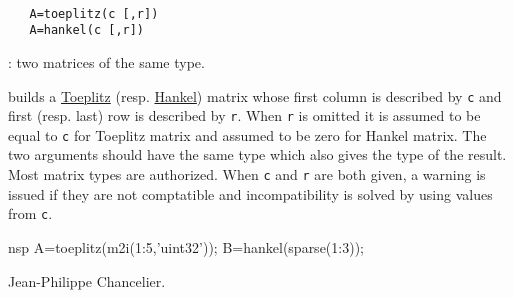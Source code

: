 
\begin{mandesc}
  \\ %
\end{mandesc}
\begin{calling_sequence}
\begin{verbatim}
   A=toeplitz(c [,r])   
   A=hankel(c [,r])   
\end{verbatim}
\end{calling_sequence}
\begin{parameters}
  \begin{varlist}
    : two matrices of the same type. 
  \end{varlist}
\end{parameters}
\begin{mandescription}
  builds a \href{http://en.wikipedia.org/wiki/Toeplitz_matrix}{Toeplitz}
  (resp. \href{http://en.wikipedia.org/wiki/Hankel_matrix}{Hankel})
  matrix whose first column is described 
  by \verb+c+ and first (resp. last) row is described by \verb+r+. 
  When \verb+r+ is omitted it is assumed to be equal to \verb+c+ for Toeplitz
  matrix and assumed to be zero for Hankel matrix. 
  The two arguments should have the same type which also gives the type of 
  the result. Most matrix types are authorized. 
  When \verb+c+ and \verb+r+ are both given, a warning is issued if they are 
  not comptatible and incompatibility is solved by using values from \verb+c+. 
\end{mandescription}
\begin{examples}
  \begin{mintednsp}{nsp}
    A=toeplitz(m2i(1:5,'uint32'));
    B=hankel(sparse(1:3));
  \end{mintednsp}
\end{examples}
\begin{authors}
  Jean-Philippe Chancelier. 
\end{authors}

